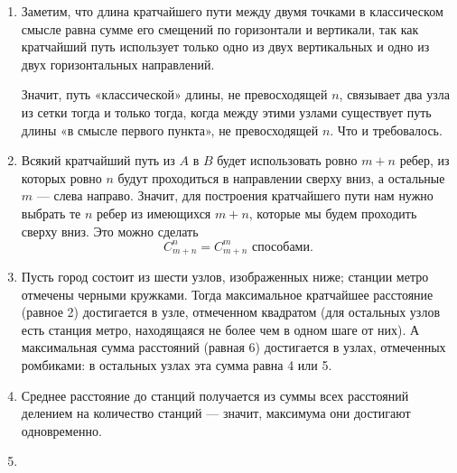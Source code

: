 \begin{enumerate}
\item Заметим, что длина кратчайшего пути между двумя точками в классическом смысле равна сумме его смещений по горизонтали и вертикали, так как кратчайший путь использует только одно из двух вертикальных и одно из двух горизонтальных направлений.

Значит, путь «классической» длины, не превосходящей $n$, связывает два узла из сетки тогда и только тогда, когда между этими узлами существует путь длины «в смысле первого пункта», не превосходящей $n$. Что и требовалось.

\item Всякий кратчайший путь из $A$ в $B$ будет использовать ровно $m+n$ ребер, из которых ровно $n$ будут проходиться в направлении сверху вниз, а остальные $m$ — слева направо. Значит, для построения кратчайшего пути нам нужно выбрать те $n$ ребер из имеющихся $m+n$, которые мы будем проходить сверху вниз. Это можно сделать
$$C_{m+n}^n = C_{m+n}^m \text{ способами.}$$

\item Пусть город состоит из шести узлов, изображенных ниже; станции метро отмечены черными кружками. Тогда максимальное кратчайшее расстояние (равное 2) достигается в узле, отмеченном квадратом (для остальных узлов есть станция метро, находящаяся не более чем в одном шаге от них). А максимальная сумма расстояний (равная 6) достигается в узлах, отмеченных ромбиками: в остальных узлах эта сумма равна  4 или 5.

\begin{center}  \end{center}

\item Среднее расстояние до станций получается из суммы всех расстояний делением на количество станций — значит, максимума они достигают одновременно.

\item \ \\


\end{enumerate}
